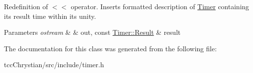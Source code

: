 Redefinition of $<$$<$ operator. Inserts formatted description of \hyperlink{classTimer}{Timer} containing its result time within its unity. 


\begin{DoxyParams}{Parameters}
{\em ostream} & \& out, const \hyperlink{classTimer_1_1Result}{Timer\-::\-Result} \& result \\
\hline
\end{DoxyParams}


The documentation for this class was generated from the following file\-:\begin{DoxyCompactItemize}
\item 
tcc\-Chrystian/src/include/timer.\-h\end{DoxyCompactItemize}
